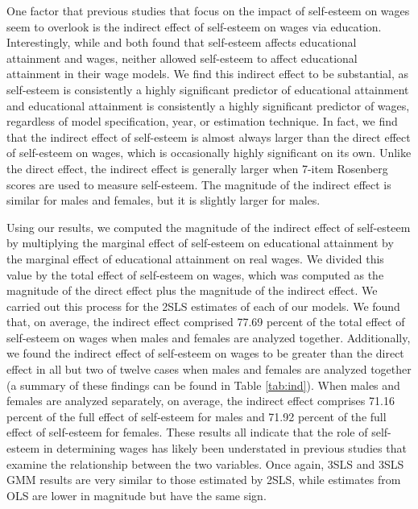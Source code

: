 \documentclass[12pt]{report}
\newcommand{\citee}[1]{\citename{#1} \citeyear{#1}}
\begin{document}
One factor that previous studies that focus on the impact of self-esteem on wages seem to overlook is the indirect effect of self-esteem on wages via education. Interestingly, while \citee{W1999} and \citee{W2006} both found that self-esteem affects educational attainment and wages, neither allowed self-esteem to affect educational attainment in their wage models. We find this indirect effect to be substantial, as self-esteem is consistently a highly significant predictor of educational attainment and educational attainment is consistently a highly significant predictor of wages, regardless of model specification, year, or estimation technique. In fact, we find that the indirect effect of self-esteem is almost always larger than the direct effect of self-esteem on wages, which is occasionally highly significant on its own. Unlike the direct effect, the indirect effect is generally larger when 7-item Rosenberg scores are used to measure self-esteem. The magnitude of the indirect effect is similar for males and females, but it is slightly larger for males.

Using our results, we computed the magnitude of the indirect effect of self-esteem by multiplying the marginal effect of self-esteem on educational attainment by the marginal effect of educational attainment on real wages. We divided this value by the total effect of self-esteem on wages, which was computed as the magnitude of the direct effect plus the magnitude of the indirect effect. We carried out this process for the 2SLS estimates of each of our models. We found that, on average, the indirect effect comprised 77.69 percent of the total effect of self-esteem on wages when males and females are analyzed together. Additionally, we found the indirect effect of self-esteem on wages to be greater than the direct effect in all but two of twelve cases when males and females are analyzed together (a summary of these findings can be found in Table \ref{tab:ind}). When males and females are analyzed separately, on average, the indirect effect comprises 71.16 percent of the full effect of self-esteem for males and 71.92 percent of the full effect of self-esteem for females. These results all indicate that the role of self-esteem in determining wages has likely been understated in previous studies that examine the relationship between the two variables. Once again, 3SLS and 3SLS GMM results are very similar to those estimated by 2SLS, while estimates from OLS are lower in magnitude but have the same sign.
\end{document}
